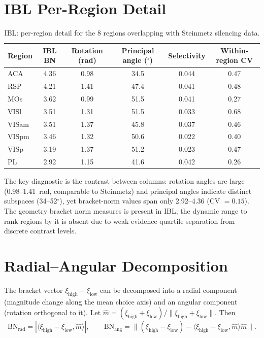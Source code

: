 \documentclass[9pt,lineno]{elife}
\begin{document}
\section{IBL Per-Region Detail}
\label{app:ibl}

\begin{table}[h]
\centering
\caption{IBL: per-region detail for the 8 regions overlapping with Steinmetz silencing data.}
\label{tab:ibl_detail}
\small
\begin{tabular}{lccccc}
\toprule
Region & IBL BN & Rotation (rad) & Principal angle ($^\circ$) & Selectivity & Within-region CV \\
\midrule
ACA & 4.36 & 0.98 & 34.5 & 0.044 & 0.47 \\
RSP & 4.21 & 1.41 & 47.4 & 0.041 & 0.48 \\
MOs & 3.62 & 0.99 & 51.5 & 0.041 & 0.27 \\
VISl & 3.51 & 1.31 & 51.5 & 0.033 & 0.68 \\
VISam & 3.51 & 1.37 & 45.8 & 0.037 & 0.46 \\
VISpm & 3.46 & 1.32 & 50.6 & 0.022 & 0.40 \\
VISp & 3.19 & 1.37 & 51.2 & 0.023 & 0.47 \\
PL & 2.92 & 1.15 & 41.6 & 0.042 & 0.26 \\
\bottomrule
\end{tabular}
\end{table}

The key diagnostic is the contrast between columns: rotation angles are large (0.98--1.41~rad, comparable to Steinmetz) and principal angles indicate distinct subspaces (34--52$^\circ$), yet bracket-norm values span only 2.92--4.36 (CV $= 0.15$). The geometry bracket norm measures is present in IBL; the dynamic range to rank regions by it is absent due to weak evidence-quartile separation from discrete contrast levels.

\section{Radial--Angular Decomposition}
\label{app:decomposition}

The bracket vector $\xi_{\text{high}} - \xi_{\text{low}}$ can be decomposed into a radial component (magnitude change along the mean choice axis) and an angular component (rotation orthogonal to it). Let $\hat{m} = (\xi_{\text{high}} + \xi_{\text{low}}) / \lVert \xi_{\text{high}} + \xi_{\text{low}} \rVert$. Then
\[
\text{BN}_{\text{rad}} = |\langle \xi_{\text{high}} - \xi_{\text{low}}, \hat{m} \rangle|, \qquad
\text{BN}_{\text{ang}} = \lVert (\xi_{\text{high}} - \xi_{\text{low}}) - \langle \xi_{\text{high}} - \xi_{\text{low}}, \hat{m} \rangle \hat{m} \rVert .
\]
\end{document}
